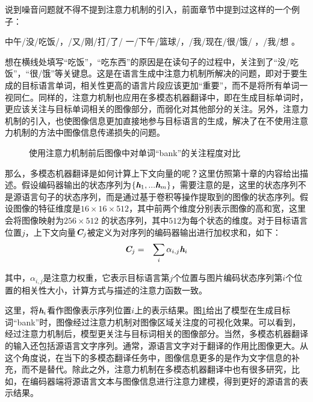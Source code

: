 \parinterval 说到噪音问题就不得不提到注意力机制的引入，前面章节中提到过这样的一个例子：

\vspace{0.8em}
\centerline{中午/没/吃饭/，/又/刚/打/了/ 一/下午/篮球/，/我/现在/很/饿/ ，/我/想\underline{\quad \quad} 。}
\vspace{0.8em}

\parinterval 想在横线处填写“吃饭”，“吃东西”的原因是在读句子的过程中，关注到了“没/吃饭”，“很/饿”等关键息。这是在语言生成中注意力机制所解决的问题，即对于要生成的目标语言单词，相关性更高的语言片段应该更加“重要”，而不是将所有单词一视同仁。同样的，注意力机制也应用在多模态机器翻译中，即在生成目标单词时，更应该关注与目标单词相关的图像部分，而弱化对其他部分的关注。另外，注意力机制的引入，也使图像信息更加直接地参与目标语言的生成，解决了在不使用注意力机制的方法中图像信息传递损失的问题。

\begin{figure}[htp]
\centering

\caption{使用注意力机制前后图像中对单词“bank”的关注程度对比}
\label{tab:17-2-3-c}
\end{figure}

\parinterval 那么，多模态机器翻译是如何计算上下文向量的呢？这里仿照第十章的内容给出描述。假设编码器输出的状态序列为$\{\textbf{\em h}_1,...\textbf{\em h}_m\}$，需要注意的是，这里的状态序列不是源语言句子的状态序列，而是通过基于卷积等操作提取到的图像的状态序列。假设图像的特征维度是$16 \times 16 \times 512$，其中前两个维度分别表示图像的高和宽，这里会将图像映射为$256 \times 512$ 的状态序列，其中$512$为每个状态的维度。对于目标语言位置$j$，上下文向量$\textbf{\em C}_{j}$被定义为对序列的编码器输出进行加权求和，如下：
\begin{eqnarray}
\textbf{\em C}_{j}&=& \sum_{i}{{\alpha}_{i,j}{\textbf{\em h}}_{i}}
\end{eqnarray}

\noindent 其中，${\alpha}_{i,j}$是注意力权重，它表示目标语言第$j$个位置与图片编码状态序列第$i$个位置的相关性大小，计算方式与{\chapterten}描述的注意力函数一致。

\parinterval 这里，将$\textbf{\em h}_{i}$看作图像表示序列位置$i$上的表示结果。图\ref{tab:17-2-3-c}给出了模型在生成目标词“bank”时，图像经过注意力机制对图像区域关注度的可视化效果。可以看到，经过注意力机制后，模型更关注与目标词相关的图像部分。当然，多模态机器翻译的输入还包括源语言文字序列。通常，源语言文字对于翻译的作用比图像更大。从这个角度说，在当下的多模态翻译任务中，图像信息更多的是作为文字信息的补充，而不是替代。除此之外，注意力机制在多模态机器翻译中也有很多研究，比如，在编码器端将源语言文本与图像信息进行注意力建模，得到更好的源语言的表示结果。

